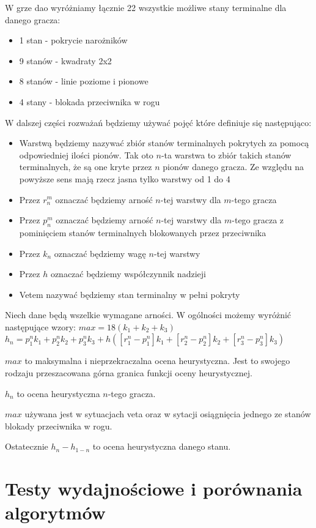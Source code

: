\documentclass{scrartcl}
\begin{document}
W grze dao wyróżniamy łącznie 22 wszystkie możliwe stany terminalne dla danego gracza:
\begin{itemize}
\item 1 stan - pokrycie narożników
\item 9 stanów - kwadraty 2x2
\item 8 stanów - linie poziome i pionowe
\item 4 stany - blokada przeciwnika w rogu
\end{itemize}
W dalszej części rozważań będziemy używać pojęć które definiuje się następująco:
\begin{itemize}
\item Warstwą będziemy nazywać zbiór stanów terminalnych pokrytych za pomocą odpowiedniej ilości pionów. Tak oto $n$-ta warstwa to zbiór takich stanów terminalnych, że są one kryte przez $n$ pionów danego gracza. Ze względu na powyższe sens mają rzecz jasna tylko warstwy od 1 do 4
\item Przez $r_{n}^{m}$ oznaczać będziemy arność $n$-tej warstwy dla $m$-tego gracza
\item Przez $p_{n}^{m}$ oznaczać będziemy arność $n$-tej warstwy dla $m$-tego gracza z pominięciem stanów terminalnych blokowanych przez przeciwnika
\item Przez $k_{n}$ oznaczać będziemy wagę $n$-tej warstwy
\item Przez $h$ oznaczać będziemy współczynnik nadzieji
\item Vetem nazywać będziemy stan terminalny w pełni pokryty
\end{itemize}
Niech dane będą wszelkie wymagane arności. W ogólności możemy wyróżnić następujące wzory:
$max = 18 ( k_{1} + k_{2} + k_{3} )$
$h_{n} = p_{1}^{n} k_{1} + p_{2}^{n} k_{2} + p_{3}^{n} k_{3} + h ([r_{1}^{n} - p_{1}^{n}] k_{1} + [r_{2}^{n} - p_{2}^{n}] k_{2} + [r_{3}^{n} - p_{3}^{n}] k_{3})$

$max$ to maksymalna i nieprzekraczalna ocena heurystyczna. Jest to swojego rodzaju przeszacowana górna granica funkcji oceny heurystycznej.

$h_{n}$ to ocena heurystyczna $n$-tego gracza.

$max$ używana jest w sytuacjach veta oraz w sytacji osiągnięcia jednego ze stanów blokady przeciwnika w rogu.

Ostatecznie $h_{n} - h_{1-n}$ to ocena heurystyczna danego stanu.

\section{Testy wydajnościowe i porównania algorytmów}
\end{document}
